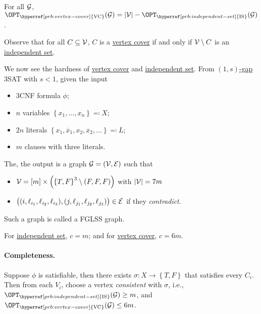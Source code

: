 \begin{claim}
	For all \(\mathcal{\MakeUppercase{g}} \), \(\OPT_{\hyperref[prb:vertex-cover]{\text{VC}}}(\mathcal{\MakeUppercase{g}} ) = \vert \mathcal{\MakeUppercase{v}} \vert - \OPT_{\hyperref[prb:independent-set]{\text{IS}}}(\mathcal{\MakeUppercase{g}} )\).
\end{claim}
\begin{explanation}
	Observe that for all \(C \subseteq \mathcal{\MakeUppercase{v}} \), \(C\) is a \hyperref[prb:vertex-cover]{vertex cover} if and only if \(\mathcal{\MakeUppercase{v}} \setminus C\) is an \hyperref[prb:independent-set]{independent set}.
\end{explanation}

We now see the hardness of \hyperref[prb:vertex-cover]{vertex cover} and \hyperref[prb:independent-set]{independent set}. From \hyperref[def:c-s-gap]{\((1, s)\)-gap} 3SAT with \(s < 1\), given the input
\begin{itemize}
	\item 3CNF formula \(\phi \);
	\item \(n\) variables \(\left\{ x_1, \ldots , x_n\right\} \eqqcolon X\);
	\item \(2n\) literals \(\left\{ x_1, \overline{x}_1, x_2, \overline{x}_2, \ldots \right\} \eqqcolon L\);
	\item \(m\) clauses with three literals.
\end{itemize}

The, the output is a graph \(\mathcal{\MakeUppercase{g}} =(\mathcal{\MakeUppercase{v}} , \mathcal{\MakeUppercase{e}} )\) such that
\begin{itemize}
	\item \(\mathcal{\MakeUppercase{v}} = [m]\times \left( \left\{ T, F \right\} ^3 \setminus (F, F, F) \right)\) with \(\vert \mathcal{\MakeUppercase{v}}  \vert = 7m\)
	\item \(\big((i, \ell _{i_1}, \ell _{i_2}, \ell _{i_3}), (j, \ell _{j_1}, \ell _{j_2}, \ell _{j_3})\big)\in \mathcal{\MakeUppercase{e}} \) if they \emph{contradict}.
\end{itemize}

\begin{note}
	Such a graph is called a FGLSS graph.
\end{note}

For \hyperref[prb:independent-set]{independent set}, \(c = m\); and for \hyperref[prb:vertex-cover]{vertex cover}, \(c = 6m\).

\paragraph*{Completeness.}
Suppose \(\phi \) is satisfiable, then there exists \(\sigma \colon X \to \left\{ T, F \right\} \) that satisfies every \(C_i\). Then from each \(V_i\), choose a vertex \emph{consistent} with \(\sigma \), i.e., \(\OPT_{\hyperref[prb:independent-set]{\text{IS}} }(\mathcal{\MakeUppercase{g}} ) \geq m\), and \(\OPT_{\hyperref[prb:vertex-cover]{\text{VC}} }(\mathcal{\MakeUppercase{g}} ) \leq 6m\).


